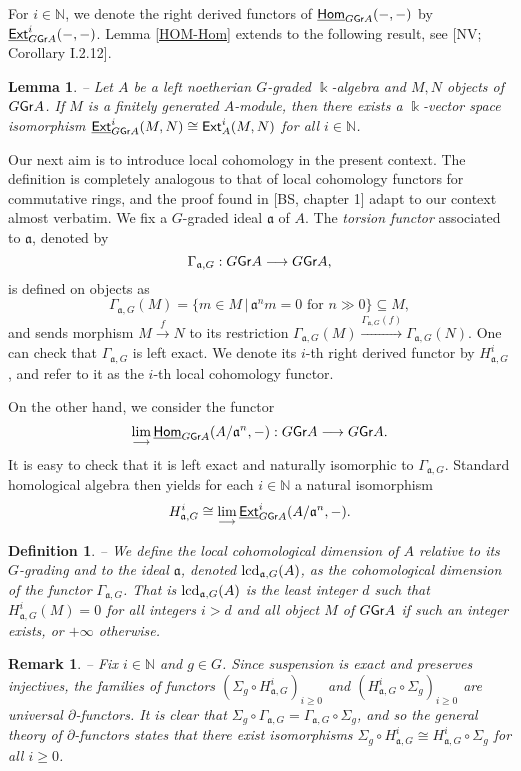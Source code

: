 \documentclass[twoside,11pt]{article}
\newcommand{\lcd}{{\rm lcd}}
\renewcommand{\k}{\Bbbk}
\newcommand{\N}{{\mathbb N}}
\newcommand{\GG}{{\Gamma}}
\renewcommand{\a}{{\mathfrak a}}
\newcommand{\GrMod}{{\sf Gr}}
\newcommand{\HOM}{\underline{{\sf Hom}}}
\newcommand{\Ext}{{\sf Ext}}
\newcommand{\EXT}{\underline{\sf Ext}}
\newcommand{\colim}{\displaystyle\lim_{\longrightarrow}}
\newcommand{\tq}{\,|\,}
\newtheorem{subdefinition}[subtheorem]{Definition}
\newtheorem{sublemma}[subtheorem]{Lemma}
\newtheorem{subremark}[subtheorem]{Remark}
\begin{document}
For $i\in\N$, we denote the right derived functors of $\HOM_{G\GrMod A}(-,-)$ by
$\EXT^i_{G\GrMod A}(-,-)$. Lemma \ref{HOM-Hom} extends to the following result,
see [NV; Corollary I.2.12].  

\begin{sublemma} \label{EXT-Ext} -- 
Let $A$ be a left noetherian $G$-graded $\k$-algebra and $M,N$ objects of $G\GrMod A$. If
$M$ is a finitely generated $A$-module, then there exists a $\k$-vector space isomorphism
$\EXT^i_{G\GrMod A}(M,N) \cong \Ext^i_A(M,N)$ for all $i \in \N$.
\end{sublemma}

Our next aim is to introduce local cohomology in the present context. The definition is
completely analogous to that of local cohomology functors for commutative rings, and the
proof found in [BS, chapter 1] adapt to our context almost verbatim. We fix a
$G$-graded ideal $\a$ of $A$. The \emph{torsion functor} associated to $\a$, denoted by
\[
\Gamma_{\a,G} : G\GrMod A \longrightarrow G\GrMod A,
\]
is defined on objects as
\[
\Gamma_{\a,G}(M) = \{m\in M \tq \a^n m = 0 \mbox{ for } n \gg 0\} \subseteq M,
\]
and sends morphism $M \stackrel{f}{\longrightarrow} N$ to its restriction 
$\Gamma_{\a,G}(M) \stackrel{\Gamma_{\a,G}(f)}{\longrightarrow} \Gamma_{\a,G}(N)$. 
One can check that $\Gamma_{\a,G}$ is left exact. We denote its $i$-th right derived
functor by $H_{\a,G}^i$, and refer to it as the $i$-th local cohomology functor.

On the other hand, we consider the functor
\[
\colim \HOM_{G\GrMod A}(A/\a^n,-) : G\GrMod A  \longrightarrow  G\GrMod A.
\]
It is easy to check that it is left exact and naturally isomorphic to $\Gamma_{\a,G}$.
Standard homological algebra then yields for each $i \in \N$ a natural isomorphism
\[
H_{\a,G}^i \cong \colim \EXT_{G\GrMod A }^i(A/\a^n,-).
\]

\begin{subdefinition} -- \label{lc-def}
We define the local cohomological dimension of $A$ relative to its $G$-grading and to the
ideal $\a$, denoted $\lcd_{\a,G}(A)$, as the cohomological dimension of the functor
$\Gamma_{\a,G}$. That is $\lcd_{\a,G}(A)$ is the least integer $d$ such that
$H_{\a,G}^i(M)=0$ for all integers $i > d$ and all object $M$ of $G\GrMod A$ if such an
integer exists, or $+ \infty$ otherwise.
\end{subdefinition}

\begin{subremark} -- \label{lc-and-suspension} \rm 
Fix $i\in\N$ and $g\in G$. Since suspension is exact and preserves injectives, the
families of functors $(\Sigma_g \circ H^i_{\a,G})_{i \geq 0}$ and $(H^i_{\a,G} \circ
\Sigma_g)_{i \geq 0}$ are universal $\partial$-functors. It is clear that $\Sigma_g \circ
\GG_{\a, G} = \Gamma_{\a,G} \circ \Sigma_g$, and so the general theory of
$\partial$-functors states that there exist isomorphisms $\Sigma_g \circ H^i_{\a,G} \cong
H^i_{\a,G} \circ \Sigma_g$ for all $i \geq 0$.
\end{subremark}
\end{document}
